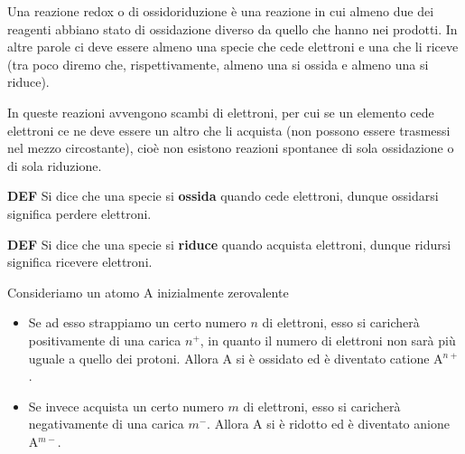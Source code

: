 Una reazione redox  o di ossidoriduzione è una reazione in cui almeno due dei reagenti abbiano stato di ossidazione diverso da quello che hanno nei prodotti. In altre parole ci deve essere almeno una specie che cede elettroni e una che li riceve (tra poco diremo che, rispettivamente, almeno una si ossida e almeno una si riduce).

In queste reazioni avvengono scambi di elettroni, per cui se un elemento cede elettroni ce ne deve essere un altro che li acquista (non possono essere trasmessi nel mezzo circostante), cioè non esistono reazioni spontanee di sola ossidazione o di sola riduzione.

\vspace{0.2cm}\textbf{DEF} Si dice che una specie si \textbf{ossida} quando cede elettroni, dunque ossidarsi significa perdere elettroni.

\vspace{0.2cm}\textbf{DEF} Si dice che una specie si \textbf{riduce} quando acquista elettroni, dunque ridursi significa ricevere elettroni.

\vspace{0.2cm}Consideriamo un atomo A inizialmente zerovalente

\begin{figure}[H]
  \centering
\end{figure}


\begin{itemize}[leftmargin=0.5cm]
  \item Se ad esso strappiamo un certo numero $n$ di elettroni, esso si caricherà positivamente di una carica $n^+$, in quanto il numero di elettroni non sarà più uguale a quello dei protoni. Allora A si è ossidato ed è diventato catione A$^{n+}$.
  \item Se invece acquista un certo numero $m$ di elettroni, esso si caricherà negativamente di una carica $m^-$. Allora A si è ridotto ed è diventato anione A$^{m-}$.
\end{itemize}

